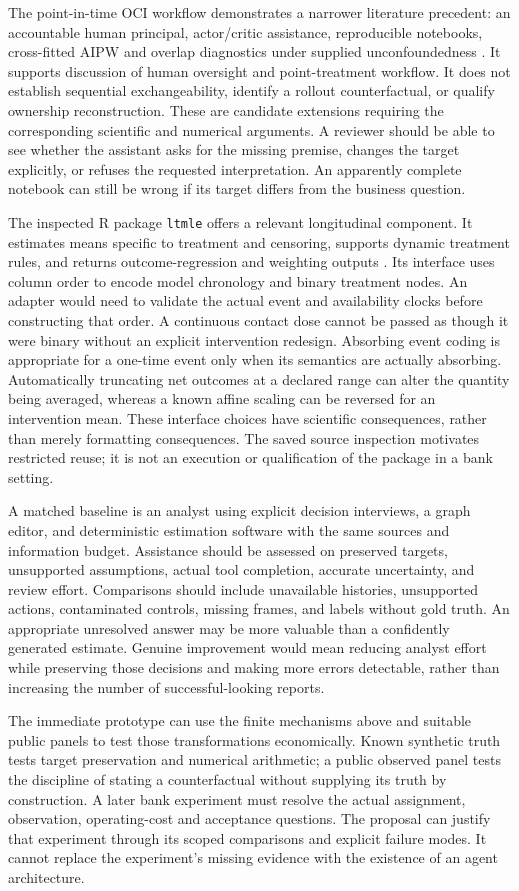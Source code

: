 The point-in-time OCI workflow demonstrates a narrower literature precedent:
an accountable human principal, actor/critic assistance, reproducible notebooks,
cross-fitted AIPW and overlap diagnostics under supplied unconfoundedness
\cite{exec13_data_oci}. It supports discussion of human oversight and
point-treatment workflow. It does not establish sequential exchangeability,
identify a rollout counterfactual, or qualify ownership reconstruction. These
are candidate extensions requiring the corresponding scientific and numerical
arguments. A reviewer should be able to see whether the assistant asks for
the missing premise, changes the target explicitly, or refuses the requested
interpretation. An apparently complete notebook can still be wrong if its
target differs from the business question.

The inspected R package \texttt{ltmle} offers a relevant longitudinal
component. It estimates means specific to treatment and censoring, supports
dynamic treatment rules, and returns outcome-regression and weighting
outputs \citep{sw_ltmle}. Its interface
uses column order to encode model chronology and binary treatment nodes.
An adapter would need to validate the actual event and availability clocks
before constructing that order. A continuous contact dose cannot be passed
as though it were binary without an explicit intervention redesign.
Absorbing event coding is appropriate for a one-time event only when its
semantics are actually absorbing. Automatically truncating net outcomes at a
declared range can alter the quantity being averaged, whereas a known affine
scaling can be reversed for an intervention mean. These interface choices
have scientific consequences, rather than merely formatting consequences.
The saved source inspection motivates restricted reuse; it is not an execution
or qualification of the package in a bank setting.

A matched baseline is an analyst using explicit decision interviews, a graph
editor, and deterministic estimation software with the same sources and
information budget. Assistance should be assessed on preserved targets,
unsupported assumptions, actual tool completion, accurate uncertainty, and
review effort. Comparisons should include unavailable histories, unsupported
actions, contaminated controls, missing frames, and labels without gold truth.
An appropriate unresolved answer may be more valuable than a confidently
generated estimate. Genuine improvement would mean reducing analyst effort
while preserving those decisions and making more errors detectable, rather
than increasing the number of successful-looking reports.

The immediate prototype can use the finite mechanisms above and suitable
public panels to test those transformations economically. Known synthetic
truth tests target preservation and numerical arithmetic; a public observed
panel tests the discipline of stating a counterfactual without supplying its
truth by construction. A later bank experiment must resolve the actual
assignment, observation, operating-cost and acceptance questions. The proposal
can justify that experiment through its scoped comparisons and explicit
failure modes. It cannot replace the experiment's missing evidence with the
existence of an agent architecture.
\label{exec14:l5-development-end}
